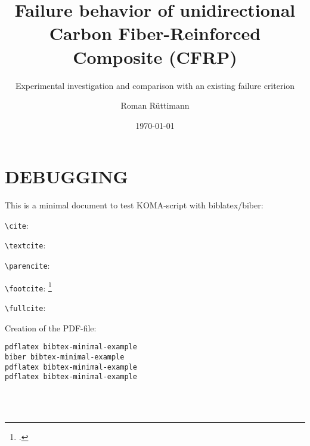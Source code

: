 \documentclass[paper=a4, twoside=true, fontsize=11pt, ]{scrbook}
\title{Failure behavior of unidirectional Carbon Fiber-Reinforced Composite (CFRP)}
\subtitle{Experimental investigation and comparison with an existing failure criterion}
\author{Roman Rüttimann}
\date{\today}
\newcommand*{\texpath}{content}
\begin{document}
\maketitle
\cleardoublepage

\frontmatter

\cleardoublepage
%

\cleardoublepage
\tableofcontents
\cleardoublepage
%

\cleardoublepage

\mainmatter







\cleardoublepage
{}
\listoffigures

\cleardoublepage
{}
{}
\listoftables

\cleardoublepage
{}
\clearpage
\renewcommand*{\chapterpagestyle}{empty}
\printbibliography

\chapter{DEBUGGING}

This is a minimal document to test KOMA-script with biblatex/biber:

\verb+\cite+: \cite{daniel2007failure}

\verb+\textcite+: \textcite{daniel2018new}

\verb+\parencite+: \parencite{calsson2014experimental}

\verb+\footcite+: \footcite{D6641standard}

\verb+\fullcite+: 

Creation of the PDF-file:
\begin{verbatim}
pdflatex bibtex-minimal-example
biber bibtex-minimal-example
pdflatex bibtex-minimal-example
pdflatex bibtex-minimal-example
\end{verbatim}

\lipsum[1]\\
\lipsum[2]\\
\lipsum[3]

\appendix\appendixtrue
\clearpage

\end{document}
